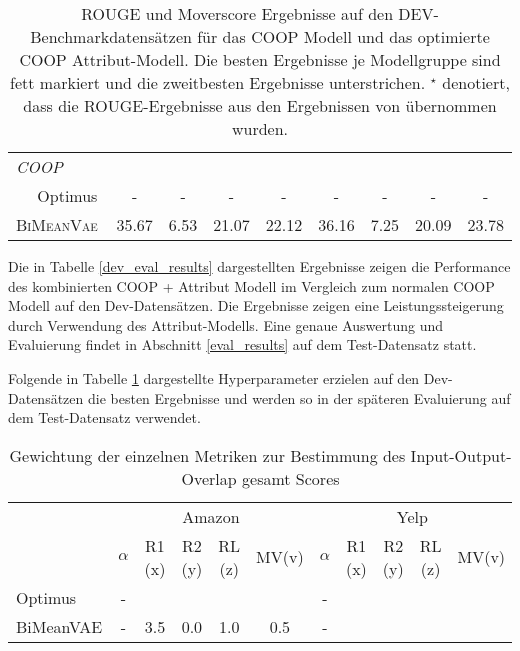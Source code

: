 \begin{table}[!h]
\begin{tabular}{@{}lcccccccc@{}}
    \textit{COOP}              &         &         &        &        &        & &   &    \\
    $\quad$ Optimus        & - & -  & - & - & -  & -  & - & -\\ 
    $\quad$ \textsc{BiMeanVae} &  35.67 &6.53 & 21.07 & 22.12 & 36.16	&7.25&20.09 & 23.78\\ 
    
    	\bottomrule
    
    \end{tabular}
    \caption{ROUGE und Moverscore Ergebnisse auf den DEV-Benchmarkdatensätzen für das COOP Modell und das optimierte COOP Attribut-Modell. Die besten Ergebnisse je Modellgruppe sind fett markiert und die zweitbesten Ergebnisse unterstrichen.
    $^{\star}$ denotiert, dass die ROUGE-Ergebnisse aus den Ergebnissen von \citep{coop} übernommen wurden.
    }
\end{table}

Die in Tabelle \ref{dev_eval_results} dargestellten Ergebnisse zeigen die Performance des kombinierten COOP + Attribut Modell im Vergleich zum normalen COOP Modell auf den Dev-Datensätzen.
Die Ergebnisse zeigen eine Leistungssteigerung durch Verwendung des Attribut-Modells. Eine genaue Auswertung und Evaluierung findet in Abschnitt \ref{eval_results} auf dem Test-Datensatz statt.

Folgende in Tabelle \ref{weight_mv} dargestellte Hyperparameter erzielen auf den Dev-Datensätzen die besten Ergebnisse und werden so in der späteren Evaluierung auf dem Test-Datensatz verwendet.

\begin{table}[h!]
    \centering
    \begin{tabular}{@{}lcccccccccc@{}}
    \toprule
    & \multicolumn{5}{c}{Amazon} & \multicolumn{5}{c}{Yelp} \\ 
             &$\alpha$ & R1 (x)  & R2 (y)  & RL (z) & MV(v)&$\alpha$ &  R1 (x)  & R2 (y)  & RL (z) & MV(v) \\ \midrule
    Optimus   &-&   &   &   &  &  - &   &&   &  \\
    BiMeanVAE &-& 3.5   & 0.0  &  1.0 & 0.5 & -&  &   &   &    \\ \bottomrule
    \end{tabular}
    \caption{Gewichtung der einzelnen Metriken zur Bestimmung des Input-Output-Overlap gesamt Scores}
    \label{weight_mv}
\end{table}

